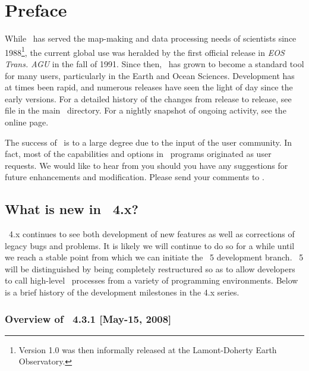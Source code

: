 %
%
\chapter{Preface} 
\label{ch:1}
\thispagestyle{headings}

While \GMT\ has served the map-making and data processing needs of scientists since 1988\footnote{Version
1.0 was then informally released at the Lamont-Doherty Earth Observatory.}, the current global use was
heralded by the first official release in \emph{EOS Trans. AGU} in the fall of 1991.  Since then,
\GMT\ has grown to become a standard tool for many users, particularly in the Earth and Ocean Sciences.
Development has at times been rapid, and numerous releases have seen the light of day since the early
versions.  For a detailed history of the changes from release to release, see file 
in the main \GMT\ directory.  For a nightly snapshot of ongoing activity, see the online
 page.

The success of \GMT\ is to a large degree due to the input of the user community. In fact, most of the
capabilities and options in \GMT\ programs originated as user requests.
We would like to hear from you should you have any suggestions for future enhancements and modification.
Please send your comments to
.

\section{What is new in \gmt\ 4.x?}

\GMT\ 4.x continues to see both development of new features as well as corrections of
legacy bugs and problems.  It is likely we will continue to do so for a while until we
reach a stable point from which we can initiate the \GMT\ 5 development branch.  \GMT\ 5
will be distinguished by being completely restructured so as to allow developers to call
high-level \GMT\ processes from a variety of programming environments.  Below is a brief
history of the development milestones in the 4.x series.

\subsection{Overview of \gmt\ 4.3.1 [May-15, 2008]}

